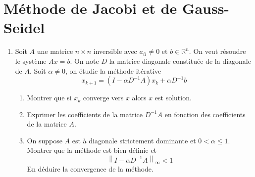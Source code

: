 \documentclass[a4paper]{article}
\begin{document}
\section{Méthode de Jacobi et de Gauss-Seidel}
\begin{enumerate}
\item Soit $A$ une matrice $n\times n$ inversible avec $a_{ii} \neq 0$ et $b \in \mathbb{R}^n$. On veut résoudre le système $Ax = b$. On note $D$ la matrice diagonale constituée de la diagonale de $A$. Soit $\alpha \neq 0$, on
étudie la méthode itérative
\[x_{k+1}=\left(I-\alpha D^{-1}A\right) x_k +\alpha D^{-1} b \]
\begin{enumerate}
\item Montrer que si $x_k$ converge vers $x$ alors $x$ est solution.
\item Exprimer les coefficients de la matrice $D^{-1}A$ en fonction des coefficients de la matrice $A$.
\item On suppose $A$ est à diagonale strictement dominante et $0< \alpha \leq 1$. Montrer que la méthode est bien définie et
\[\left\| I- \alpha D^{-1}A\right\|_{\infty}<1\]
En déduire la convergence de la méthode.
\end{enumerate}



\end{enumerate}
\end{document}
